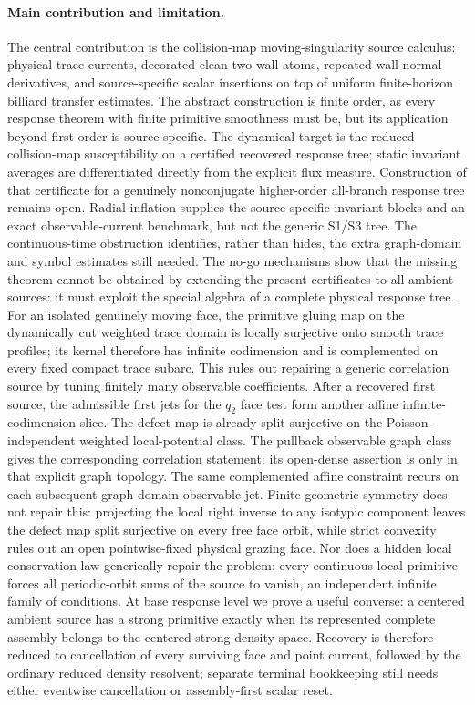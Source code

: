 \documentclass[11pt]{amsart}
\theoremstyle{compactplain}
\theoremstyle{compactdefinition}
\theoremstyle{compactremark}
\begin{document}
\paragraph{Main contribution and limitation.}
The central contribution is the collision-map moving-singularity source calculus:
physical trace currents, decorated clean two-wall atoms, repeated-wall normal
derivatives, and source-specific scalar insertions on top of uniform
finite-horizon billiard transfer estimates.  The abstract construction is
finite order, as every response theorem with finite primitive smoothness
must be, but its application beyond first order is source-specific.  The dynamical target is the
reduced collision-map susceptibility on a certified recovered response tree;
static invariant averages are differentiated directly from the explicit flux
measure.  Construction of that certificate for a genuinely nonconjugate
higher-order all-branch response tree remains open.  Radial inflation supplies
the source-specific invariant blocks and an exact observable-current benchmark,
but not the generic S1/S3 tree.  The continuous-time obstruction identifies,
rather than hides, the extra graph-domain and symbol estimates still needed.
The no-go mechanisms show that the missing theorem cannot be obtained by
extending the present certificates to all ambient sources: it must exploit the
special algebra of a complete physical response tree.
For an isolated genuinely moving face, the primitive gluing map on the
dynamically cut weighted trace domain is locally surjective onto smooth trace
profiles; its kernel therefore has
infinite codimension and is complemented on every fixed compact trace subarc.
This rules out repairing a generic correlation source
by tuning finitely many observable coefficients.  After a recovered
first source, the admissible first jets for the \(q_2\) face test form another
affine infinite-codimension slice.  The defect map is already split surjective
on the Poisson-independent weighted local-potential class.  The pullback
observable graph class gives the corresponding correlation statement; its
open-dense assertion is only in that explicit graph topology.  The same
complemented affine constraint recurs on each subsequent graph-domain
observable jet.
Finite geometric symmetry does not repair this: projecting the local right
inverse to any isotypic component leaves the defect map split surjective on every free face
orbit, while strict convexity rules out an open pointwise-fixed physical
grazing face.
Nor does a hidden local conservation law generically repair the problem:
every continuous local primitive forces all periodic-orbit sums of the source
to vanish, an independent infinite family of conditions.
At base response level we prove a useful converse: a centered ambient source
has a strong primitive exactly when its represented complete assembly belongs
to the centered strong density space.  Recovery is therefore reduced to
cancellation of every surviving face and point current, followed by the
ordinary reduced density resolvent; separate terminal bookkeeping still needs
either eventwise cancellation or assembly-first scalar reset.
\end{document}
